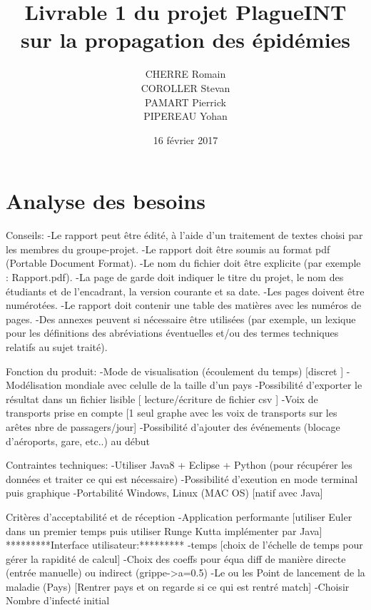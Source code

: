 \documentclass[12pt,a4paper]{report}
\title{Livrable 1 du projet PlagueINT sur la propagation des épidémies}
\date{16 février 2017}
\author{CHERRE Romain \\ COROLLER Stevan \\ PAMART Pierrick \\ PIPEREAU Yohan}
\begin{document}
\maketitle
\chapter*{Analyse des besoins}


\begin{flushleft}
Conseils:
-Le rapport peut être édité, à l'aide d'un traitement de textes choisi par
les membres du groupe-projet.
-Le rapport doit être soumis au format pdf (Portable Document Format).
-Le nom du fichier doit être explicite (par exemple : Rapport.pdf).
 -La page de garde doit indiquer le titre du projet, le nom des étudiants et de l'encadrant, la version courante et sa date.
-Les pages doivent être numérotées.
-Le rapport doit contenir une table des matières avec les numéros de pages.
-Des annexes peuvent si nécessaire être utilisées (par exemple, un lexique pour les définitions des abréviations éventuelles et/ou des termes techniques relatifs au sujet traité).
\end{flushleft}

\begin{flushleft}
Fonction du produit:
-Mode de visualisation (écoulement du temps) [discret ]
-Modélisation mondiale avec celulle de la taille d'un pays
-Possibilité d'exporter le résultat dans un fichier lisible [ lecture/écriture de fichier csv ]
-Voix de transports prise en compte [1 seul graphe avec les voix de transports sur les arêtes nbre de passagers/jour]
-Possibilité d'ajouter des événements (blocage d'aéroports, gare, etc..) au début
\end{flushleft}

\begin{flushleft}
Contraintes techniques:
-Utiliser Java8 + Eclipse + Python (pour récupérer les données et traiter ce qui est nécessaire)
-Possibilité d'exeution en mode terminal puis graphique
-Portabilité Windows, Linux (MAC OS) [natif avec Java]
\end{flushleft}

\begin{flushleft}
Critères d'acceptabilité et de réception
-Application performante [utiliser Euler dans un premier temps puis utiliser Runge Kutta implémenter par Java]
*********Interface utilisateur:*********
-temps [choix de l'échelle de temps pour gérer la rapidité de calcul]
-Choix des coeffs pour équa diff de manière directe (entrée manuelle) ou indirect (grippe->a=0.5)
-Le ou les Point de lancement de la maladie (Pays) [Rentrer pays et on regarde si ce qui est rentré match]
-Choisir Nombre d'infecté initial
\end{flushleft}
\end{document}
